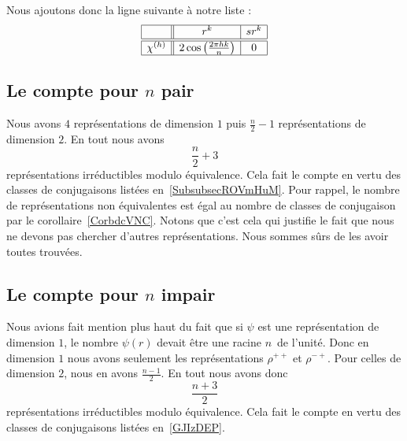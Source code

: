 Nous ajoutons donc la ligne suivante à notre liste :
\begin{equation*}
    \begin{array}[]{|c||c|c|}
        \hline
        &r^k&sr^k\\
        \hline\hline
        \chi^{(h)}&2\cos\left( \frac{ 2\pi hk }{ n } \right)&0\\
        \hline
    \end{array}
\end{equation*}

\subsection{Le compte pour \texorpdfstring{$ n$}{n} pair}

Nous avons \( 4\) représentations de dimension \( 1\) puis \( \frac{ n }{2}-1\) représentations de dimension \( 2\). En tout nous avons
\begin{equation}
 \frac{ n }{2}+3
\end{equation}
représentations irréductibles modulo équivalence. Cela fait le compte en vertu des classes de conjugaisons listées en~\ref{SubsubsecROVmHuM}. Pour rappel, le nombre de représentations non équivalentes est égal au nombre de classes de conjugaison par le corollaire~\ref{CorbdcVNC}. Notons que c'est cela qui justifie le fait que nous ne devons pas chercher d'autres représentations. Nous sommes sûrs de les avoir toutes trouvées.

\subsection{Le compte pour \texorpdfstring{$ n$}{n} impair}

Nous avions fait mention plus haut du fait que si \( \psi\) est une représentation de dimension \( 1\), le nombre \( \psi(r)\) devait être une racine \( n\)\ieme\ de l'unité. Donc en dimension \( 1\) nous avons seulement les représentations \( \rho^{++}\) et \( \rho^{-+}\). Pour celles de dimension \( 2\), nous en avons \( \frac{ n-1 }{2}\). En tout nous avons donc
\begin{equation}
    \frac{ n+3 }{2}
\end{equation}
représentations irréductibles modulo équivalence. Cela fait le compte en vertu des classes de conjugaisons listées en~\ref{GJIzDEP}.
